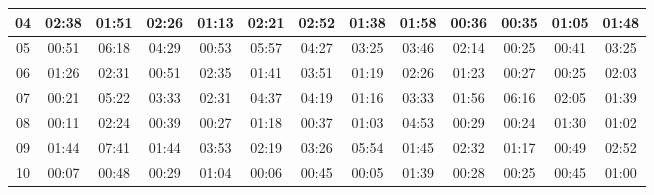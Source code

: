 \begin{center}
\begin{sideways}
\begin{tabular}{|l|l|l|l|l|l|l|l|l|l|l|l|l|}
\hline
\multicolumn{1}{|c|}{04} & 
\multicolumn{1}{c|}{02:38} & \multicolumn{1}{c|}{01:51} & \multicolumn{1}{c|}{02:26} & \multicolumn{1}{c|}{01:13} & \multicolumn{1}{c|}{02:21}	& \multicolumn{1}{c|}{02:52} & \multicolumn{1}{c|}{01:38} & \multicolumn{1}{c|}{01:58} & \multicolumn{1}{c|}{00:36} & \multicolumn{1}{c|}{00:35} & \multicolumn{1}{c|}{01:05} & \multicolumn{1}{c|}{01:48} \\ 
\hline
\multicolumn{1}{|c|}{05} & 
\multicolumn{1}{c|}{00:51} & \multicolumn{1}{c|}{06:18} & \multicolumn{1}{c|}{04:29} & \multicolumn{1}{c|}{00:53} & \multicolumn{1}{c|}{05:57} & \multicolumn{1}{c|}{04:27} & \multicolumn{1}{c|}{03:25} & \multicolumn{1}{c|}{03:46} & \multicolumn{1}{c|}{02:14} & \multicolumn{1}{c|}{00:25} & \multicolumn{1}{c|}{00:41} & \multicolumn{1}{c|}{03:25} \\ 
\hline
\multicolumn{1}{|c|}{06} &  
\multicolumn{1}{c|}{01:26} & \multicolumn{1}{c|}{02:31} & \multicolumn{1}{c|}{00:51} & \multicolumn{1}{c|}{02:35} & \multicolumn{1}{c|}{01:41}	& \multicolumn{1}{c|}{03:51} & \multicolumn{1}{c|}{01:19} & \multicolumn{1}{c|}{02:26} & \multicolumn{1}{c|}{01:23} & \multicolumn{1}{c|}{00:27} & \multicolumn{1}{c|}{00:25} & \multicolumn{1}{c|}{02:03} \\ 
\hline
\multicolumn{1}{|c|}{07} & \multicolumn{1}{c|}{00:21} & \multicolumn{1}{c|}{05:22} & \multicolumn{1}{c|}{03:33} & \multicolumn{1}{c|}{02:31} & \multicolumn{1}{c|}{04:37}	& \multicolumn{1}{c|}{04:19} & \multicolumn{1}{c|}{01:16} & \multicolumn{1}{c|}{03:33} & \multicolumn{1}{c|}{01:56} & \multicolumn{1}{c|}{06:16} & \multicolumn{1}{c|}{02:05} & \multicolumn{1}{c|}{01:39} \\ 
\hline
\multicolumn{1}{|c|}{08} & 
\multicolumn{1}{c|}{00:11} & \multicolumn{1}{c|}{02:24} & \multicolumn{1}{c|}{00:39} & \multicolumn{1}{c|}{00:27} & \multicolumn{1}{c|}{01:18} & \multicolumn{1}{c|}{00:37} & \multicolumn{1}{c|}{01:03} & \multicolumn{1}{c|}{04:53} & \multicolumn{1}{c|}{00:29} & \multicolumn{1}{c|}{00:24} & \multicolumn{1}{c|}{01:30} & \multicolumn{1}{c|}{01:02} \\ 
\hline
\multicolumn{1}{|c|}{09} & 
\multicolumn{1}{c|}{01:44} & \multicolumn{1}{c|}{07:41} & \multicolumn{1}{c|}{01:44} & \multicolumn{1}{c|}{03:53} & \multicolumn{1}{c|}{02:19}	& \multicolumn{1}{c|}{03:26} & \multicolumn{1}{c|}{05:54} & \multicolumn{1}{c|}{01:45} & \multicolumn{1}{c|}{02:32} & \multicolumn{1}{c|}{01:17} & \multicolumn{1}{c|}{00:49} & \multicolumn{1}{c|}{02:52} \\ 
\hline
\multicolumn{1}{|c|}{10} & 
\multicolumn{1}{c|}{00:07} & \multicolumn{1}{c|}{00:48} & \multicolumn{1}{c|}{00:29} & \multicolumn{1}{c|}{01:04} & \multicolumn{1}{c|}{00:06}	& \multicolumn{1}{c|}{00:45} & \multicolumn{1}{c|}{00:05} & \multicolumn{1}{c|}{01:39} & \multicolumn{1}{c|}{00:28} & \multicolumn{1}{c|}{00:25} & \multicolumn{1}{c|}{00:45} & \multicolumn{1}{c|}{01:00} \\ 

\end{tabular}
\end{sideways}
\end{center}
